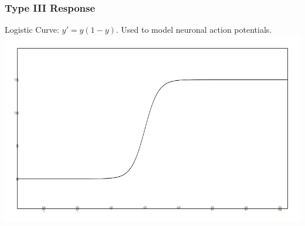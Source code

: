 \begin{frame}
  \frametitle{Type III Response}
    Logistic Curve: $y'=y(1-y)$. Used to model neuronal action potentials.
    \includegraphics[scale=.4]{typeIII.jpg}
\end{frame}

